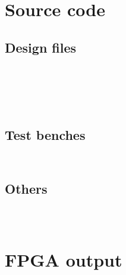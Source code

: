 \appendix
\section{Source code}
\subsection{Design files}
\inputminted{VHDL}{../RSA/RSA.srcs/sources/rsa.vhd}
\inputminted{VHDL}{../RSA/RSA.srcs/sources/u_rsa_controller.vhd}
\inputminted{VHDL}{../RSA/RSA.srcs/sources/u_rsa_datapath.vhd}
\inputminted{VHDL}{../RSA/RSA.srcs/sources/monpro.vhd}
\inputminted{VHDL}{../RSA/RSA.srcs/sources/u_monpro_controller.vhd}
\inputminted{VHDL}{../RSA/RSA.srcs/sources/u_monpro_datapath.vhd}

\subsection{Test benches}
\inputminted[firstline=8]{VHDL}{../RSA/RSA.srcs/sim/RSACoreTestBench.vhd}
\inputminted{VHDL}{../RSA/RSA.srcs/sim/RSA_Monpro_tb.vhd}

\subsection{Others}
\inputminted{VHDL}{../RSA/RSA.srcs/sim/RSAParameters.vhd}
\inputminted{VHDL}{../RSA/RSA.srcs/sim/CompDecl.vhd}
\inputminted{text}{../RSA/RSA.srcs/sim/ComFile.txt}

\section{FPGA output}
\inputminted{text}{../fpga_output.txt}